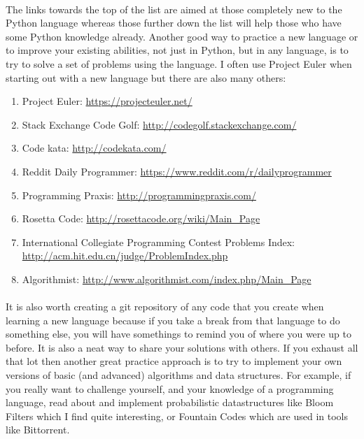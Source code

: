 \documentclass[12pt, a4paper, twoside]{book}
\begin{document}
\paragraph{} The links towards the top of the list are aimed at those completely new to the Python language whereas those further down the list will help those who have some Python knowledge already. Another good way to practice a new language or to improve your existing abilities, not just in Python, but in any language, is to try to solve a set of problems using the language. I often use Project Euler when starting out with a new language but there are also many others:

\begin{enumerate}
\item Project Euler: \url{https://projecteuler.net/}
\item Stack Exchange Code Golf: \url{http://codegolf.stackexchange.com/}
\item Code kata: \url{http://codekata.com/}
\item Reddit Daily Programmer: \url{https://www.reddit.com/r/dailyprogrammer}
\item Programming Praxis: \url{http://programmingpraxis.com/}
\item Rosetta Code: \url{http://rosettacode.org/wiki/Main_Page}
\item International Collegiate Programming Contest Problems Index: \url{http://acm.hit.edu.cn/judge/ProblemIndex.php}
\item Algorithmist: \url{http://www.algorithmist.com/index.php/Main_Page}
\end{enumerate}

\paragraph{} It is also worth creating a git repository of any code that you create when learning a new language because if you take a break from that language to do something else, you will have somethings to remind you of where you were up to before. It is also a neat way to share your solutions with others. If you exhaust all that lot then another great practice approach is to try to implement your own versions of basic (and advanced) algorithms and data structures. For example, if you really want to challenge yourself, and your knowledge of a programming language, read about and implement probabilistic datastructures like Bloom Filters which I find quite interesting, or Fountain Codes which are used in tools like Bittorrent.
\end{document}
